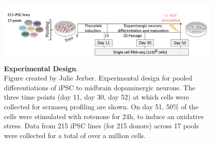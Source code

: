 \begin{figure}[h]
\includegraphics[width=16cm]{Chapter5/Fig/neuroseq_experimental_design.png}
\caption[Experimental Design]{\textbf{Experimental Design}.\\
Figure created by Julie Jerber.
Experimental design for pooled differentiations of iPSC to midbrain dopaminergic neurons. 
The three time points (day 11, day 30, day 52) at which cells were collected for \gls{scrnaseq} profiling are shown. 
On day 51, 50\% of the cells were stimulated with rotenone for 24h, to induce an oxidative stress.
Data from 215 iPSC lines (for 215 donors) across 17 pools were collected for a total of over a million cells.}
\label{fig:neuroseq_experimental_design}
\end{figure}





